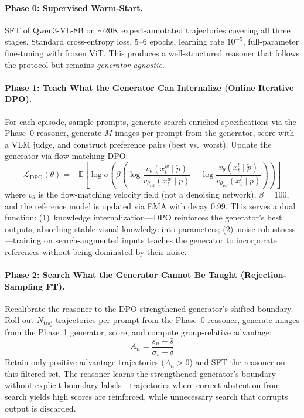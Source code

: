 \documentclass[11pt,a4paper]{article}
\begin{document}
\paragraph{Phase 0: Supervised Warm-Start.} SFT of Qwen3-VL-8B on ${\sim}$20K expert-annotated trajectories covering all three stages. Standard cross-entropy loss, 5--6 epochs, learning rate $10^{-5}$, full-parameter fine-tuning with frozen ViT. This produces a well-structured reasoner that follows the protocol but remains \emph{generator-agnostic}.

\paragraph{Phase 1: Teach What the Generator Can Internalize (Online Iterative DPO).} For each episode, sample prompts, generate search-enriched specifications via the Phase~0 reasoner, generate $M$ images per prompt from the generator, score with a VLM judge, and construct preference pairs (best vs.\ worst). Update the generator via flow-matching DPO:
\[
\mathcal{L}_{\mathrm{DPO}}(\theta) = -\mathbb{E}\!\left[\log \sigma\!\left(\beta \left(\log \frac{v_\theta(x_t^w \mid \tilde{p})}{v_{\theta_{\mathrm{ref}}}(x_t^w \mid \tilde{p})} - \log \frac{v_\theta(x_t^l \mid \tilde{p})}{v_{\theta_{\mathrm{ref}}}(x_t^l \mid \tilde{p})}\right)\right)\right]
\]
where $v_\theta$ is the flow-matching velocity field (not a denoising network), $\beta = 100$, and the reference model is updated via EMA with decay 0.99. This serves a dual function: (1)~knowledge internalization---DPO reinforces the generator's best outputs, absorbing stable visual knowledge into parameters; (2)~noise robustness---training on search-augmented inputs teaches the generator to incorporate references without being dominated by their noise.

\paragraph{Phase 2: Search What the Generator Cannot Be Taught (Rejection-Sampling FT).} Recalibrate the reasoner to the DPO-strengthened generator's shifted boundary. Roll out $N_{\mathrm{traj}}$ trajectories per prompt from the Phase~0 reasoner, generate images from the Phase~1 generator, score, and compute group-relative advantage:
\[
A_n = \frac{s_n - \bar{s}}{\sigma_s + \delta}
\]
Retain only positive-advantage trajectories ($A_n > 0$) and SFT the reasoner on this filtered set. The reasoner learns the strengthened generator's boundary without explicit boundary labels---trajectories where correct abstention from search yields high scores are reinforced, while unnecessary search that corrupts output is discarded.
\end{document}
